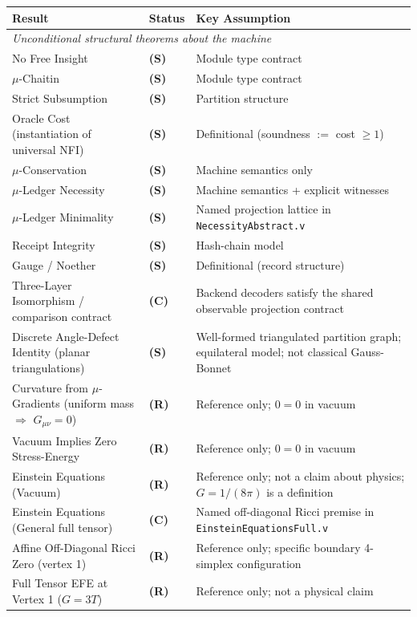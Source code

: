 \documentclass[11pt, a4paper]{report}
\theoremstyle{definition}
\theoremstyle{plain}
\begin{document}
\begin{center}
\small
\begin{tabular}{lll}
\textbf{Result} & \textbf{Status} & \textbf{Key Assumption} \\
\hline
\multicolumn{3}{l}{\emph{Unconditional structural theorems about the machine}} \\
\hline
No Free Insight & \textbf{(S)} & Module type contract \\
$\mu$-Chaitin & \textbf{(S)} & Module type contract \\
Strict Subsumption & \textbf{(S)} & Partition structure \\
Oracle Cost (instantiation of universal NFI) & \textbf{(S)} & Definitional (soundness $:=$ cost $\ge 1$) \\
$\mu$-Conservation & \textbf{(S)} & Machine semantics only \\
$\mu$-Ledger Necessity & \textbf{(S)} & Machine semantics + explicit witnesses \\
$\mu$-Ledger Minimality & \textbf{(S)} & Named projection lattice in \texttt{NecessityAbstract.v} \\
Receipt Integrity & \textbf{(S)} & Hash-chain model \\
Gauge / Noether & \textbf{(S)} & Definitional (record structure) \\
Three-Layer Isomorphism / comparison contract & \textbf{(C)} & Backend decoders satisfy the shared observable projection contract \\
Discrete Angle-Defect Identity (planar triangulations) & \textbf{(S)} & Well-formed triangulated partition graph; equilateral model; not classical Gauss-Bonnet \\
Curvature from $\mu$-Gradients (uniform mass $\Rightarrow$ $G_{\mu\nu}=0$) & \textbf{(R)} & Reference only; $0=0$ in vacuum \\
Vacuum Implies Zero Stress-Energy & \textbf{(R)} & Reference only; $0=0$ in vacuum \\
Einstein Equations (Vacuum) & \textbf{(R)} & Reference only; not a claim about physics; $G=1/(8\pi)$ is a definition \\
Einstein Equations (General full tensor) & \textbf{(C)} & Named off-diagonal Ricci premise in \texttt{EinsteinEquationsFull.v} \\
Affine Off-Diagonal Ricci Zero (vertex 1) & \textbf{(R)} & Reference only; specific boundary 4-simplex configuration \\
Full Tensor EFE at Vertex 1 ($G=3T$) & \textbf{(R)} & Reference only; not a physical claim \\

\end{tabular}
\end{center}
\end{document}
